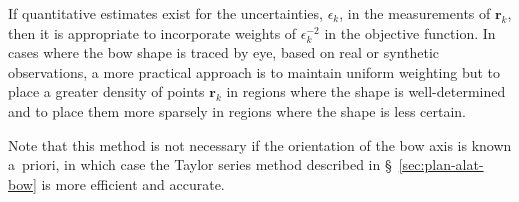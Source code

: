 If quantitative estimates exist for the uncertainties, \(\epsilon_k\), in the
measurements of \(\bm{r}_k\), then it is appropriate to incorporate
weights of \(\epsilon_k^{-2}\) in the objective function.  In cases where the
bow shape is traced by eye, based on real or synthetic observations, a
more practical approach is to maintain uniform weighting but to place
a greater density of points \(\bm{r}_k\) in regions where the shape is
well-determined and to place them more sparsely in regions where the
shape is less certain.

Note that this method is not necessary if the orientation of the bow
axis is known a~priori, in which case the Taylor series method
described in \S~\ref{sec:plan-alat-bow} is more efficient and
accurate.


